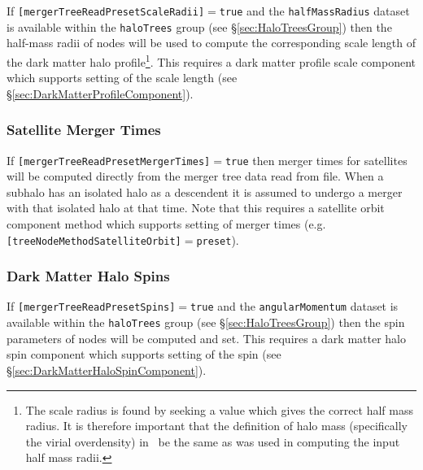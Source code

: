 If {\tt [mergerTreeReadPresetScaleRadii]}$=${\tt true} and the {\tt halfMassRadius} dataset is available within the {\tt haloTrees} group (see \S\ref{sec:HaloTreesGroup}) then the half-mass radii of nodes will be used to compute the corresponding scale length of the dark matter halo profile\footnote{The scale radius is found by seeking a value which gives the correct half mass radius. It is therefore important that the definition of halo mass (specifically the virial overdensity) in \protect\glc\ be the same as was used in computing the input half mass radii.}. This requires a dark matter profile scale component which supports setting of the scale length (see \S\ref{sec:DarkMatterProfileComponent}).

\subsubsection{Satellite Merger Times}

If {\tt [mergerTreeReadPresetMergerTimes]}$=${\tt true} then merger times for satellites will be computed directly from the merger tree data read from file. When a subhalo has an isolated halo as a descendent it is assumed to undergo a merger with that isolated halo at that time. Note that this requires a satellite orbit component method which supports setting of merger times (e.g. {\tt [treeNodeMethodSatelliteOrbit]}$=${\tt preset}).

\subsubsection{Dark Matter Halo Spins}

If {\tt [mergerTreeReadPresetSpins]}$=${\tt true} and the {\tt angularMomentum} dataset is available within the {\tt haloTrees} group (see \S\ref{sec:HaloTreesGroup}) then the spin parameters of nodes will be computed and set. This requires a dark matter halo spin component which supports setting of the spin (see \S\ref{sec:DarkMatterHaloSpinComponent}).
